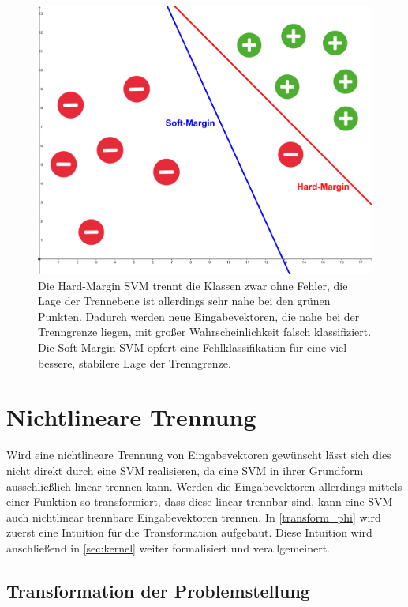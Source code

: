\documentclass[a4paper,11pt,twoside]{scrreprt}
\begin{document}
\begin{figure}[H]
	\centering
	\includegraphics[width = 13cm]{assets/hard_vs_soft_margin.png}
	\caption{Die Hard-Margin \ac{SVM} trennt die Klassen zwar ohne Fehler, die Lage der Trennebene ist allerdings sehr nahe bei den grünen Punkten. Dadurch werden neue Eingabevektoren, die nahe bei der Trenngrenze liegen, mit großer Wahrscheinlichkeit falsch klassifiziert. Die Soft-Margin SVM \glqq{}opfert\grqq{} eine Fehlklassifikation für eine viel bessere, stabilere Lage der Trenngrenze.}
	\label{fig:hard_vs_soft_svm}
\end{figure}






\chapter{Nichtlineare Trennung}

Wird eine nichtlineare Trennung von Eingabevektoren gewünscht lässt sich dies nicht direkt durch eine \ac{SVM} realisieren, da eine \ac{SVM} in ihrer Grundform ausschließlich linear trennen kann. Werden die Eingabevektoren allerdings mittels einer Funktion so transformiert, dass diese linear trennbar sind, kann eine \ac{SVM} auch nichtlinear trennbare Eingabevektoren trennen. In \autoref{transform_phi} wird zuerst eine Intuition für die Transformation aufgebaut. Diese Intuition wird anschließend in \autoref{sec:kernel} weiter formalisiert und verallgemeinert. 

\section{Transformation der Problemstellung} \label{transform_phi}
\end{document}
